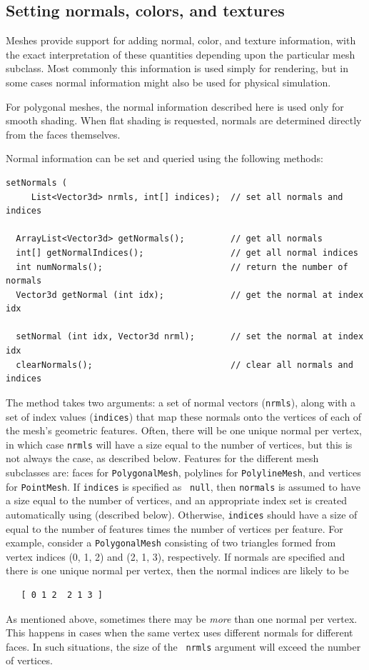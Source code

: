 \subsection{Setting normals, colors, and textures}

Meshes provide support for adding normal, color, and texture
information, with the exact interpretation of these quantities
depending upon the particular mesh subclass. Most commonly this
information is used simply for rendering, but in some cases normal
information might also be used for physical simulation.

\begin{sideblock}
For polygonal meshes, the normal information described here is used
only for smooth shading. When flat shading is requested, normals are
determined directly from the faces themselves.
\end{sideblock}

Normal information can be set and queried using
the following methods:
%
\begin{lstlisting}[]
  setNormals (
     List<Vector3d> nrmls, int[] indices);  // set all normals and indices

  ArrayList<Vector3d> getNormals();         // get all normals
  int[] getNormalIndices();                 // get all normal indices
  int numNormals();                         // return the number of normals
  Vector3d getNormal (int idx);             // get the normal at index idx

  setNormal (int idx, Vector3d nrml);       // set the normal at index idx
  clearNormals();                           // clear all normals and indices
\end{lstlisting}
%
The method  takes
two arguments: a set of normal vectors ({\tt nrmls}), along with a set
of index values ({\tt indices}) that map these normals onto the
vertices of each of the mesh's geometric features. Often, there will
be one unique normal per vertex, in which case {\tt nrmls} will have a
size equal to the number of vertices, but this is not always the case,
as described below.  Features for the different mesh subclasses are:
faces for {\tt PolygonalMesh}, polylines for {\tt PolylineMesh}, and
vertices for {\tt PointMesh}.  If {\tt indices} is specified as {\tt
null}, then {\tt normals} is assumed to have a size equal to the
number of vertices, and an appropriate index set is created
automatically using
(described below). Otherwise, {\tt indices} should have a size of
equal to the number of features times the number of vertices per
feature. For example, consider a {\tt PolygonalMesh} consisting of two
triangles formed from vertex indices (0, 1, 2) and (2, 1, 3),
respectively. If normals are specified and there is one unique normal
per vertex, then the normal indices are likely to be
%
\begin{verbatim}
   [ 0 1 2  2 1 3 ]
\end{verbatim}
%
As mentioned above, sometimes there may be {\it more} than one normal
per vertex. This happens in cases when the same vertex uses different
normals for different faces. In such situations, the size of the {\tt
nrmls} argument will exceed the number of vertices.

